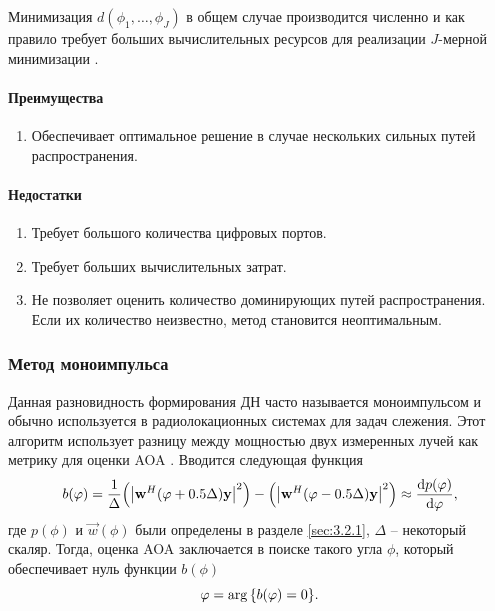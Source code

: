 Минимизация $d(\phi_1, \hdots, \phi_J)$ в общем случае производится численно и
как правило требует больших вычислительных ресурсов для реализации $J$-мерной
минимизации \cite{Tuncer2009}. 


\paragraph{Преимущества}%
\begin{enumerate}
    \item Обеспечивает оптимальное решение в случае нескольких сильных путей распространения.
\end{enumerate}

\paragraph{Недостатки}%
\begin{enumerate}
    \item Требует большого количества цифровых портов.
    \item Требует больших вычислительных затрат.
    \item Не позволяет оценить количество доминирующих путей распространения. Если их количество неизвестно, метод становится неоптимальным. 
\end{enumerate}

\subsubsection{Метод моноимпульса}%
\label{sec:monopulse}

Данная разновидность формирования ДН часто называется моноимпульсом и обычно 
используется в радиолокационных системах для задач слежения. 
Этот алгоритм использует разницу между мощностью двух измеренных лучей как метрику для 
оценки AOA \cite{Tuncer2009}. Вводится следующая функция 
\begin{equation}
    \label{eq:3.11}
    b(\phi) = \frac{1}{\Delta} \qty(\abs{\vec w^H(\phi+0.5 \Delta)\vec y}^2)
    -
    \qty(\abs{\vec w^H(\phi-0.5 \Delta)\vec y}^2) \approx \dv{p(\phi)}{\phi} ,
\end{equation}
где $p(\phi)$ и $\vec w(\phi)$ были определены в разделе \ref{sec:3.2.1}, $\Delta$ -- некоторый скаляр. Тогда, оценка AOA
заключается в поиске такого угла $\phi$, который обеспечивает нуль функции $b(\phi)$
\begin{equation}
    \label{eq:3.12}
    \varphi = \arg\qty{b(\varphi) = 0}.
\end{equation}

